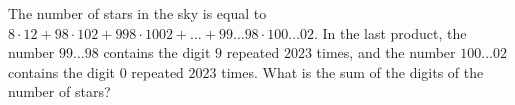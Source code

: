 The number of stars in the sky is equal to $8\cdot12+98\cdot102+998\cdot1002+\ldots+99\ldots98 \cdot100\ldots02$. In the last product, the number $99\ldots98$ contains the digit $9$ repeated $2023$ times, and the number $100\ldots02$ contains the digit $0$ repeated $2023$ times. What is the sum of the digits of the number of stars?
